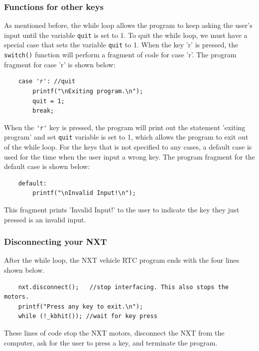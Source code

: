 \subsubsection*{Functions for other keys}
As mentioned before, the while loop allows the program to keep asking the user's input until the variable
\verb+quit+ is set to 1. To quit the while loop, we must have a special case that sets the variable \verb+quit+ to 1.
When the key 'r' is pressed, the \verb+switch()+ function will perform a fragment of code for case 'r'.
The program fragment for case 'r' is shown below:
\begin{verbatim}
    case 'r': //quit
        printf("\nExiting program.\n");
        quit = 1;
        break;
\end{verbatim}
\noindent
When the \verb+'r'+ key is pressed, the program will print out the statement 'exiting program' and set \verb+quit+
variable is set to 1, which allows the program to exit out of the while loop.
\newline
For the keys that is not specified to any cases, a default case is used for the time when the user input a wrong key.
The program fragment for the default case is shown below:
\begin{verbatim}
    default:
        printf("\nInvalid Input!\n");
\end{verbatim}
\noindent
This fragment prints 'Invalid Input!' to the user to indicate the key they just pressed is an invalid input.

\subsubsection*{Disconnecting your NXT}
After the while loop, the NXT vehicle RTC program ends with the four lines shown below.
\begin{verbatim}
    nxt.disconnect();   //stop interfacing. This also stops the motors.
    printf("Press any key to exit.\n");
    while (!_kbhit()); //wait for key press
\end{verbatim}
\noindent
These lines of code stop the NXT motors, disconnect the NXT from the computer, ask for the user
to press a key, and terminate  the program.

